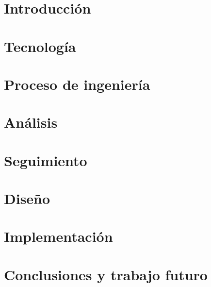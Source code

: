 \documentclass[11pt,a4paper,titlepage,twoside,openright]{report}
\begin{document}
\makeatletter
\def\cleardoublepage{\clearpage\if@twoside \ifodd\c@page\else
  \hbox{}\thispagestyle{empty}\newpage\if@twocolumn\hbox{}\newpage\fi\fi\fi}
\makeatother

\tableofcontents


\chapter{Introducción}
        \label{intro}
        
        \cleardoublepage



\chapter{Tecnología}
        \label{tec}
        
        \cleardoublepage

\chapter{Proceso de ingeniería}
		
		\cleardoublepage

\chapter{Análisis}
		
		\cleardoublepage


\chapter{Seguimiento}




\chapter{Diseño}
		
 		


\chapter{Implementación}
		


        
\chapter{Conclusiones y trabajo futuro}
        
\end{document}
